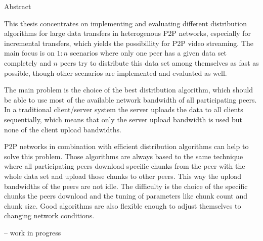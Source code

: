 \begin{center} 
\huge Abstract
\end{center}


This thesis concentrates on implementing and evaluating different distribution algorithms for large data transfers in heterogenous P2P networks, especially for incremental transfers, which yields the possibillity for P2P video streaming. The main focus is on $1:n$ scenarios where only one peer has a given data set completely and $n$ peers try to distribute this data set among themselves as fast as possible, though other scenarios are implemented and evaluated as well.

The main problem is the choice of the best distribution algorithm, which should be able to use most of the available network bandwidth of all participating peers. In a traditional client/server system the server uploads the data to all clients sequentially, which means that only the server upload bandwidth is used but none of the client upload bandwidths.

P2P networks in combination with efficient distribution algorithms can help to solve this problem. Those algorithms are always based to the same technique where all participating peers download specific chunks from the peer with the whole data set and upload those chunks to other peers. This way the upload bandwidths of the peers are not idle. The difficulty is the choice of the specific chunks the peers download and the tuning of parameters like chunk count and chunk size. Good algorithms are also flexible enough to adjust themselves to changing network conditions.

-- work in progress